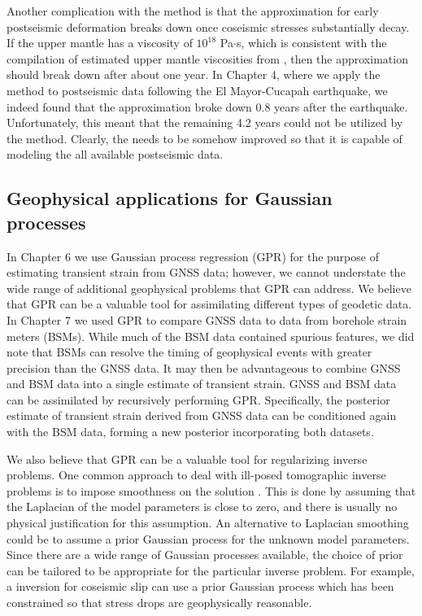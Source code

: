 Another complication with the \citet{Hines2016} method is that the approximation for early postseismic deformation breaks down once coseismic stresses substantially decay. If the upper mantle has a viscosity of $10^{18}$ Pa$\cdot$s, which is consistent with the compilation of estimated upper mantle viscosities from \citep{Thatcher2008}, then the approximation should break down after about one year. In Chapter 4, where we apply the \citet{Hines2016} method to postseismic data following the El Mayor-Cucapah earthquake, we indeed found that the approximation broke down 0.8 years after the earthquake. Unfortunately, this meant that the remaining 4.2 years could not be utilized by the \citet{Hines2016} method. Clearly, the \citet{Hines2016} needs to be somehow improved so that it is capable of modeling the all available postseismic data.             

\subsection{Geophysical applications for Gaussian processes}
In Chapter 6 we use Gaussian process regression (GPR) for the purpose of estimating transient strain from GNSS data; however, we cannot understate the wide range of additional geophysical problems that GPR can address. We believe that GPR can be a valuable tool for assimilating different types of geodetic data. In Chapter 7 we used GPR to compare GNSS data to data from borehole strain meters (BSMs). While much of the BSM data contained spurious features, we did note that BSMs can resolve the timing of geophysical events with greater precision than the GNSS data. It may then be advantageous to combine GNSS and BSM data into a single estimate of transient strain. GNSS and BSM data can be assimilated by recursively performing GPR. Specifically, the posterior estimate of transient strain derived from GNSS data can be conditioned again with the BSM data, forming a new posterior incorporating both datasets. 

We also believe that GPR can be a valuable tool for regularizing inverse problems. One common approach to deal with ill-posed tomographic inverse problems is to impose smoothness on the solution \citep{Aster2011}. This is done by assuming that the Laplacian of the model parameters is close to zero, and there is usually no physical justification for this assumption. An alternative to Laplacian smoothing could be to assume a prior Gaussian process for the unknown model parameters. Since there are a wide range of Gaussian processes available, the choice of prior can be tailored to be appropriate for the particular inverse problem. For example, a inversion for coseismic slip can use a prior Gaussian process which has been constrained so that stress drops are geophysically reasonable.             

